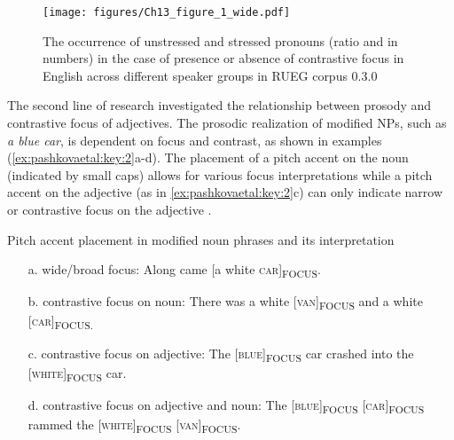 \documentclass[output=paper,colorlinks,citecolor=brown]{langscibook}
\begin{document}
\begin{figure}
    \centering
    \texttt{[image: figures/Ch13\_figure\_1\_wide.pdf]}
    \caption{The occurrence of unstressed and stressed pronouns (ratio and in numbers) in the case of presence or absence of contrastive focus in English across different speaker groups in RUEG corpus 0.3.0}
    \label{fig:pashkovaetal:1}
\end{figure}

The second line of research investigated the relationship between prosody and contrastive focus of adjectives. The prosodic realization of modified NPs, such as \textit{a blue car}, is dependent on focus and contrast, as shown in examples (\ref{ex:pashkovaetal:key:2}a-d). The placement of a pitch accent on the noun (indicated by small caps) allows for various focus interpretations while a pitch accent on the adjective (as in \ref{ex:pashkovaetal:key:2}c) can only indicate narrow or contrastive focus on the adjective \parencite{Ladd2008}.

\ea%
    \label{ex:pashkovaetal:key:2}
Pitch accent placement in modified noun phrases and its interpretation
\begin{enumerate}
    \item [a.] wide/broad focus: Along came [a white \textsc{car}]\textsubscript{FOCUS}.
    \item[b.] contrastive focus on noun: There was a white [\textsc{van}]\textsubscript{FOCUS} and a white [\textsc{car}]\textsubscript{FOCUS.}
    \item[c.] contrastive focus on adjective: The [\textsc{blue}]\textsubscript{FOCUS} car crashed into the [\textsc{white}]\textsubscript{FOCUS} car.
    \item[d.] contrastive focus on adjective and noun: The [\textsc{blue}]\textsubscript{FOCUS} [\textsc{car}]\textsubscript{FOCUS} rammed the [\textsc{white}]\textsubscript{FOCUS} [\textsc{van}]\textsubscript{FOCUS}.
\end{enumerate}
\z 
\end{document}
